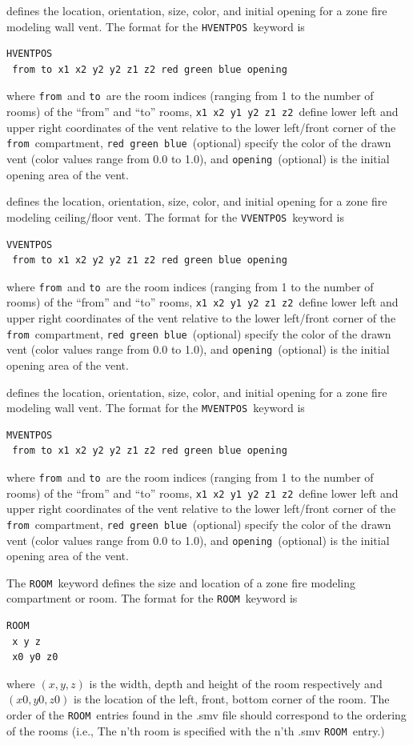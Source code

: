 \documentclass[11pt,twoside]{book}
\begin{document}
 defines the location, orientation, size, color, and initial opening for a zone fire modeling wall vent.
The format for the {\tt HVENTPOS}\ keyword is
\begin{lstlisting}
HVENTPOS
 from to x1 x2 y2 y2 z1 z2 red green blue opening
\end{lstlisting}
where {\tt from}\ and {\tt to}\  are the room indices
(ranging from 1 to the number of rooms) of the ``from'' and ``to'' rooms, {\tt x1 x2 y1 y2 z1 z2}\ define lower left and upper right
coordinates of the vent relative to the lower left/front corner of the {\tt from}\ compartment, {\tt red green blue}\ (optional) specify the
color of the drawn vent (color values range from 0.0 to 1.0), and {\tt opening}\ (optional) is the initial opening area of the vent.

 defines the location, orientation, size, color, and initial opening for a zone fire modeling ceiling/floor vent.
The format for the {\tt VVENTPOS}\ keyword is
\begin{lstlisting}
VVENTPOS
 from to x1 x2 y2 y2 z1 z2 red green blue opening
\end{lstlisting}
where {\tt from}\ and {\tt to}\  are the room indices
(ranging from 1 to the number of rooms) of the ``from'' and ``to'' rooms, {\tt x1 x2 y1 y2 z1 z2}\ define lower left and upper right
coordinates of the vent relative to the lower left/front corner of the {\tt from}\ compartment, {\tt red green blue}\ (optional) specify the
color of the drawn vent (color values range from 0.0 to 1.0), and {\tt opening}\ (optional) is the initial opening area of the vent.

 defines the location, orientation, size, color, and initial opening for a zone fire modeling wall vent.
The format for the {\tt MVENTPOS}\ keyword is
\begin{lstlisting}
MVENTPOS
 from to x1 x2 y2 y2 z1 z2 red green blue opening
\end{lstlisting}
where {\tt from}\ and {\tt to}\  are the room indices
(ranging from 1 to the number of rooms) of the ``from'' and ``to'' rooms, {\tt x1 x2 y1 y2 z1 z2}\ define lower left and upper right
coordinates of the vent relative to the lower left/front corner of the {\tt from}\ compartment, {\tt red green blue}\ (optional) specify the
color of the drawn vent (color values range from 0.0 to 1.0), and {\tt opening}\ (optional) is the initial opening area of the vent.

The {\tt ROOM}\ keyword defines the size and
location of a zone fire modeling compartment or room.
The format for the {\tt ROOM}\ keyword is
\begin{lstlisting}
ROOM
 x y z
 x0 y0 z0
\end{lstlisting}
where $(x,y,z)$ is the width, depth and height of the room
respectively and $(x0,y0,z0)$ is the location of the
left, front, bottom corner of the room.
The order of the {\tt ROOM}\ entries found in the .smv file should correspond
to the ordering of the rooms (i.e., The n'th room is specified
with the n'th .smv {\tt ROOM}\ entry.)
\end{document}
